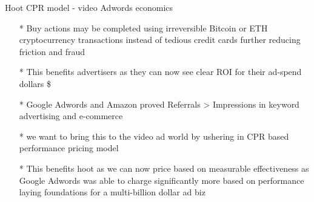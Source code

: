 \documentclass[12pt]{beamer}
\begin{document}
\begin{frame}[t]{Hoot CPR model - video Adwords economics}
\begin{itemize}

\item[*]Buy actions may be completed using irreversible  Bitcoin or ETH cryptocurrency transactions instead of tedious credit cards further reducing friction and fraud
\pause
\item[*]This benefits advertisers as they can now see clear ROI for their ad-spend dollars \$
\pause
\item[*]Google Adwords and Amazon proved Referrals > Impressions in keyword advertising and e-commerce
\pause
\item[*]we want to bring this to the video ad world by ushering in CPR based performance pricing model
\pause
\item[*]This benefits hoot as we can now price based on measurable effectiveness as Google Adwords was able to charge significantly more based on performance laying foundations for a multi-billion dollar ad biz

\end{itemize}
\end{frame}
\end{document}
